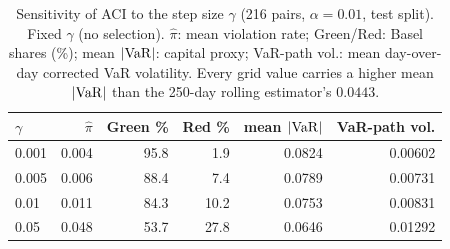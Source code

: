 \begin{table}[htbp]
	\centering
	\caption{Sensitivity of ACI to the step size $\gamma$ (216 pairs, $\alpha = 0.01$, test split). Fixed $\gamma$ (no selection). $\hat\pi$: mean violation rate; Green/Red: Basel shares (\%); mean $|\mathrm{VaR}|$: capital proxy; VaR-path vol.: mean day-over-day corrected VaR volatility. Every grid value carries a higher mean $|\mathrm{VaR}|$ than the 250-day rolling estimator's $0.0443$.}
	\label{tab:aci_gamma_sensitivity}
	\footnotesize
	\begin{tabular}{@{}lrrrrr@{}}
		\hline\hline
		$\gamma$ & $\hat\pi$ & Green \% & Red \% & mean $|\mathrm{VaR}|$ & VaR-path vol. \\
		\hline
		0.001 & 0.004 & 95.8 & 1.9 & 0.0824 & 0.00602 \\
		0.005 & 0.006 & 88.4 & 7.4 & 0.0789 & 0.00731 \\
		0.01 & 0.011 & 84.3 & 10.2 & 0.0753 & 0.00831 \\
		0.05 & 0.048 & 53.7 & 27.8 & 0.0646 & 0.01292 \\
		\hline\hline
	\end{tabular}
\end{table}
